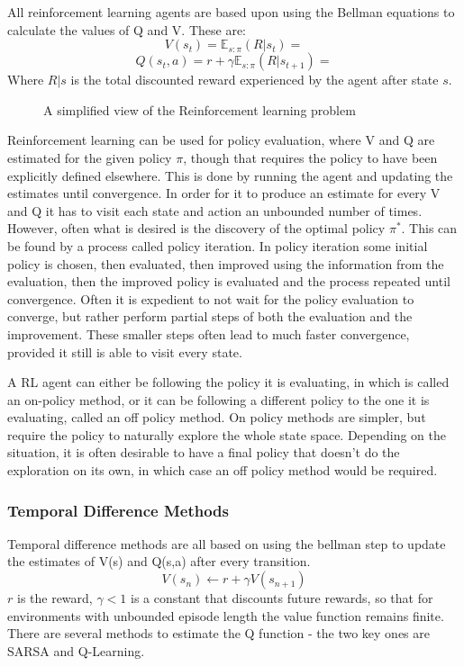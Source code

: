 All reinforcement learning agents are based upon using the Bellman equations to calculate the values of Q and V. These are:
\begin{equation}
V(s_t) = \mathbb{E}_{s:\pi}(R|s_t) = 
\end{equation}
\begin{equation}
Q(s_t,a) = r + \gamma \mathbb{E}_{s:\pi}(R|s_{t+1}) = 
\end{equation}
Where $R|s$ is the total discounted reward experienced by the agent after state $s$.


\begin{figure}[htbp]
\centering

\caption{A simplified view of the Reinforcement learning problem}
\label{fig:rlsimple}
\end{figure}

Reinforcement learning can be used for policy evaluation, where V and Q are estimated for the given policy $\pi$, though that requires the policy to have been explicitly defined elsewhere. This is done by running the agent and updating the estimates until convergence. In order for it to produce an estimate for every V and Q it has to visit each state and action an unbounded number of times. However, often what is desired is the discovery of the optimal policy $\pi^*$. This can be found by a process called policy iteration. In policy iteration some initial policy is chosen, then evaluated, then improved using the information from the evaluation, then the improved policy is evaluated and the process repeated until convergence. Often it is expedient to not wait for the policy evaluation to converge, but rather perform partial steps of both the evaluation and the improvement. These smaller steps often lead to much faster convergence, provided it still is able to visit every state.

A RL agent can either  be following the policy it is evaluating, in which is called an on-policy method, or it can be following a different policy to the one it is evaluating, called an off policy method. On policy methods are simpler, but require the policy to naturally explore the whole state space. Depending on the situation, it is often desirable to have a final policy that doesn't do the exploration on its own, in which case an off policy method would be required.

\subsubsection{Temporal Difference Methods}
Temporal difference methods are all based on using the bellman step to update the estimates of V(s) and Q(s,a) after every transition.
\begin{equation}
V(s_n) \gets r + \gamma V(s_{n+1})
\end{equation}
$r$ is the reward, $\gamma < 1$ is a constant that discounts future rewards, so that for environments with unbounded episode length the value function remains finite. There are several methods to estimate the Q function - the two key ones are SARSA and Q-Learning.

